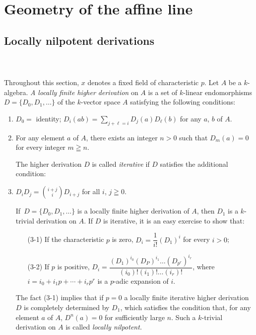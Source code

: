 \chapter{Geometry of the affine line}\label{chap1}

\section{Locally nilpotent derivations}\label{chap1:sec1}\pageoriginale\

\subsection{}\label{chap1:1.1}
Throughout this section, $x$ denotes a fixed field of characteristic
$p$. Let $A$ be a $k$-algebra. {\em A locally finite higher
  derivation} on $A$ is a set of $k$-linear endomorphisms
$D=\{D_{0},D_{1},\ldots\}$ of the $k$-vector space $A$ satisfying the
following conditions:
\begin{enumerate}
\renewcommand{\labelenumi}{(\theenumi)}
\item $D_{0}=$ identity;
  $D_{i}(ab)=\sum\limits_{j+\ell=i}D_{j}(a)D_{\ell}(b)$ for any $a$,
  $b$ of $A$.

\item For any element $a$ of $A$, there exists an integer $n>0$ such
  that $D_{m}(a)=0$ for every integer $m\geqq n$.

The higher derivation $D$ is called {\em iterative} if $D$ satisfies
the additional condition:

\item $D_{i}D_{j}=\binom{i+j}{i}D_{i+j}$ for all $i$, $j\geqq 0$.

If\pageoriginale\ $D=\{D_{0},D_{1},\ldots\}$ is a locally finite higher
derivation of 
$A$, then $D_{1}$ is a $k$-trivial derivation on $A$. If $D$ is
iterative, it is an easy exercise to show that:
\begin{itemize}
\item[(3-1)] If the characteristic $p$ is zero,
  $D_{i}=\dfrac{1}{i!}(D_{1})^{i}$ for every $i>0$;

\item[(3-2)] If $p$ is positive,
  $D_{i}=\dfrac{(D_{1})^{i_{0}}(D_{P})^{i_{1}}\ldots
  (D_{p^{r}})^{i_{r}}}{(i_{0})!(i_{1})!\ldots(i_{r})!}$, where
  $i=i_{0}+i_{1}p+\cdots+i_{r}p^{r}$ is a $p$-adic expansion of $i$.
\end{itemize}
The fact (3-1) implies that if $p=0$ a locally finite iterative higher
derivation $D$ is completely determined by $D_{1}$, which satisfies
the condition that, for any element $a$ of $A$, $D^{n}(a)=0$ for
sufficiently large $n$. Such a $k$-trivial derivation on $A$ is called
{\em locally nilpotent.}
\end{enumerate}

